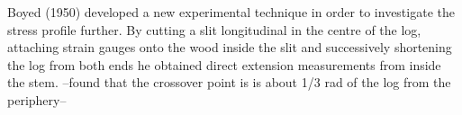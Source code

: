 Boyed (1950) developed a new experimental technique in order to investigate the
stress profile further. By cutting a slit longitudinal in the centre of the
log, attaching strain gauges onto the wood inside the slit and successively
shortening the log from both ends he obtained direct extension measurements from
inside the stem. --found that the crossover point is is about 1/3 rad of the log
from the periphery--